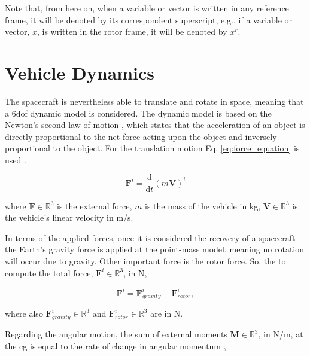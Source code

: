 Note that, from here on, when a variable or vector is written in any reference frame, it will be denoted by its correspondent superscript, e.g., if a variable or vector, $x$, is written in the rotor frame, it will be denoted by $x^r$.


\section{Vehicle Dynamics}
\label{section:vehicle_dynamics}

The spacecraft is nevertheless able to translate and rotate in space, meaning that a \gls{6dof} dynamic model is considered. The dynamic model is based on the Newton's second law of motion \cite{soler_fundamentals_2014,vepa_flight_2023}, which states that the acceleration of an object is directly proportional to the net force acting upon the object and inversely proportional to the object. For the translation motion Eq. \ref {eq:force_equation} is used \cite{soler_fundamentals_2014,vepa_flight_2023}.

\begin{equation}
    \mathbf{F}^i = \frac{\mathrm{d}}{\mathrm{d}t} \left( m \mathbf{V} \right)^i
    \label{eq:force_equation}
\end{equation}

\noindent where $\mathbf{F} \in \mathbb{R}^3$ is the external force, $m$ is the mass of the vehicle in \unit{kg}, $\mathbf{V} \in \mathbb{R}^3$ is the vehicle’s linear velocity in \unit{m/s}. 

In terms of the applied forces, once it is considered the recovery of a spacecraft the Earth's gravity force is applied at the point-mass model, meaning no rotation will occur due to gravity. Other important force is the rotor force. So, the to compute the total force, $\mathbf{F}^i \in \mathbb{R}^3$, in \unit{N}, 

\begin{equation}
    \mathbf{F}^i = \mathbf{F}_{gravity}^i + \mathbf{F}_{rotor}^i,
\end{equation}

\noindent where also $\mathbf{F}_{gravity}^i \in \mathbb{R}^3$ and $\mathbf{F}_{rotor}^i \in \mathbb{R}^3$ are in \unit{N}.

Regarding the angular motion, the sum of external moments $\mathbf{M} \in \mathbb{R}^3$, in \unit{N/m}, at the \gls{cg} is equal to the rate of change in angular momentum \cite{soler_fundamentals_2014,vepa_flight_2023},

